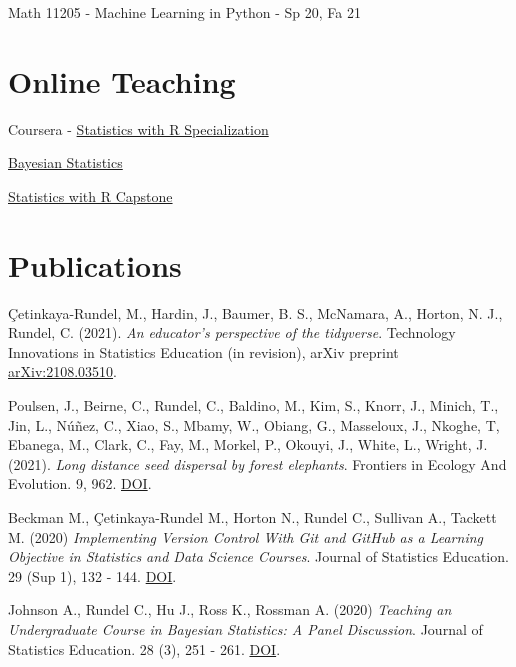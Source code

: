 \documentclass[margin,line]{res}
\begin{document}
\begin{resume}
\begin{list1}
\item[] Math 11205 - Machine Learning in Python - Sp 20, Fa 21
\end{list1}

\pagebreak


\section{\sc Online Teaching}

Coursera - \href{https://www.coursera.org/specializations/statistics}{Statistics with R Specialization}
\begin{list1}
\item[] \href{https://www.coursera.org/learn/bayesian}{Bayesian Statistics}
\item[] \href{https://www.coursera.org/learn/statistics-project}{Statistics with R Capstone}
\end{list1}

\section{\sc Publications}

Çetinkaya-Rundel, M., Hardin, J., Baumer, B. S., McNamara, A., Horton, N. J., Rundel, C. (2021). {\em An educator's perspective of the tidyverse}. Technology Innovations in Statistics Education (in revision), arXiv preprint \href{https://arxiv.org/abs/2108.03510}{arXiv:2108.03510}.

\vspace{-0.15cm}
Poulsen, J., Beirne, C., Rundel, C., Baldino, M., Kim, S., Knorr, J., Minich, T., Jin, L.,  Núñez, C., Xiao, S., Mbamy, W., Obiang, G., Masseloux, J., Nkoghe, T, Ebanega, M., Clark, C., Fay, M., Morkel, P., Okouyi, J., White, L., Wright, J. (2021). {\em Long distance seed dispersal by forest elephants}. Frontiers in Ecology And Evolution. 9, 962. \href{https://doi.org/10.3389/fevo.2021.789264}{DOI}.

\vspace{-0.15cm}
Beckman M., Çetinkaya-Rundel M., Horton N., Rundel C., Sullivan A., Tackett M. (2020) {\em Implementing Version Control With Git and GitHub as a Learning Objective in Statistics and Data Science Courses}. Journal of Statistics Education. 29 (Sup 1), 132 - 144. \href{https://doi.org/10.1080/10691898.2020.1848485}{DOI}.

\vspace{-0.15cm}
Johnson A., Rundel C., Hu J., Ross K., Rossman A. (2020) {\em Teaching an Undergraduate Course in Bayesian Statistics: A Panel Discussion}. Journal of Statistics Education. 28 (3), 251 - 261. \href{https://doi.org/10.1080/10691898.2020.1845499}{DOI}.



\end{resume}
\end{document}
